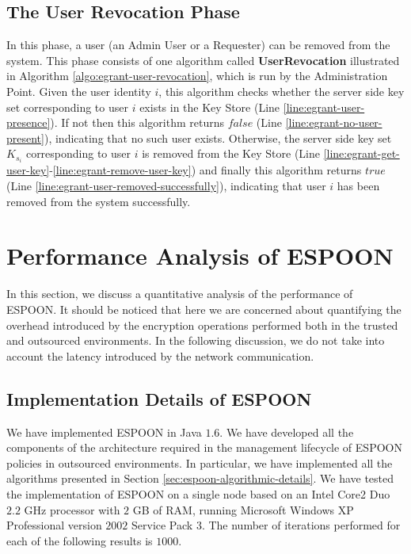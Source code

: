 \documentclass[epsfig,a4paper,11pt,titlepage]{book}
\numberwithin{algorithm}{chapter}
\begin{document}
\subsection{The User Revocation Phase}
In this phase, a user (an Admin User or a Requester) can be removed from the system. This phase consists of one algorithm called \textbf{UserRevocation} illustrated in Algorithm \ref{algo:egrant-user-revocation}, which is run by the Administration Point. Given the user identity $i$, this algorithm checks whether the server side key set corresponding to user $i$ exists in the Key Store (Line \ref{line:egrant-user-presence}). If not then this algorithm returns $\mathit{false}$ (Line \ref{line:egrant-no-user-present}), indicating that no such user exists. Otherwise, the server side key set $K_{s_i}$ corresponding to user $i$ is removed from the Key Store (Line \ref{line:egrant-get-user-key}-\ref{line:egrant-remove-user-key}) and finally this algorithm returns $\mathit{true}$ (Line \ref{line:egrant-user-removed-successfully}), indicating that user $i$ has been removed from the system successfully.

\section[Performance Analysis of ESPOON]{Performance Analysis of \gls{ESPOON}}
\label{sec:espoon-performance-analysis}
In this section, we discuss a quantitative analysis of the performance of \gls{ESPOON}. It should be noticed that here we are concerned about quantifying the overhead introduced by the encryption operations performed both in the trusted and outsourced environments. In the following discussion, we do not take into account the latency introduced by the network communication.

\subsection[Implementation Details of ESPOON]{Implementation Details of \gls{ESPOON}}
We have implemented \gls{ESPOON} in Java $1.6$. We have developed all the components of the architecture required in the management lifecycle of \gls{ESPOON} policies in outsourced environments. In particular, we have implemented all the algorithms presented in Section \ref{sec:espoon-algorithmic-details}. We have tested the implementation of \gls{ESPOON} on a single node based on an Intel Core2 Duo $2.2$ GHz processor with $2$ GB of RAM, running Microsoft Windows XP Professional version $2002$ Service Pack $3$. The number of iterations performed for each of the following results is $1000$.
\end{document}
